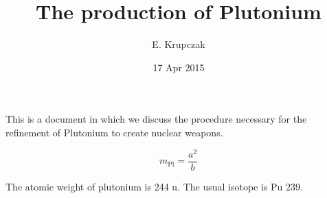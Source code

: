 \documentclass{article}
\title{The production of Plutonium}
\date{17 Apr 2015}
\author{E. Krupczak}
\begin{document}
\maketitle

This is a document in which we discuss the procedure necessary for the refinement of Plutonium to create nuclear weapons.

$$m_\text{Pl} = \frac{a^2}{b}$$

The atomic weight of plutonium is 244 u. The usual isotope is Pu 239. 
\end{document}
